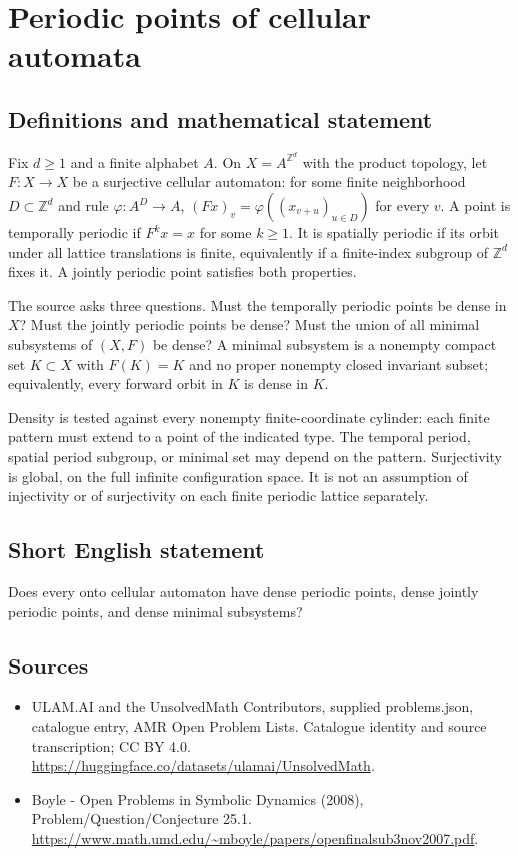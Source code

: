 \documentclass[11pt,a4paper]{article}
\begin{document}
\section*{Periodic points of cellular automata}\label{statement}

\subsection{Definitions and mathematical statement}
Fix $d\ge1$ and a finite alphabet $A$. On $X=A^{\mathbb Z^d}$ with
the product topology, let $F:X\to X$ be a surjective cellular
automaton: for some finite neighborhood $D\subset\mathbb Z^d$
and rule $\varphi:A^D\to A$,
$(Fx)_v=\varphi((x_{v+u})_{u\in D})$ for every $v$.
A point is temporally periodic if $F^k x=x$ for some $k\ge1$.
It is spatially periodic if its orbit under all lattice translations
is finite, equivalently if a finite-index subgroup of $\mathbb Z^d$
fixes it. A jointly periodic point satisfies both properties.

The source asks three questions. Must the temporally periodic points
be dense in $X$? Must the jointly periodic points be dense? Must
the union of all minimal subsystems of $(X,F)$ be dense?
A minimal subsystem is a nonempty compact set $K\subset X$ with
$F(K)=K$ and no proper nonempty closed invariant subset;
equivalently, every forward orbit in $K$ is dense in $K$.

Density is tested against every nonempty finite-coordinate cylinder:
each finite pattern must extend to a point of the indicated type.
The temporal period, spatial period subgroup, or minimal set may
depend on the pattern. Surjectivity is global, on the full infinite
configuration space. It is not an assumption of injectivity or of
surjectivity on each finite periodic lattice separately.
\subsection{Short English statement}
Does every onto cellular automaton have dense periodic points, dense jointly periodic points, and dense minimal subsystems?
\subsection{Sources}
\begin{itemize}
\item[S1] ULAM.AI and the UnsolvedMath Contributors, supplied problems.json, catalogue entry, AMR Open Problem Lists. Catalogue identity and source transcription; CC BY 4.0.
\url{https://huggingface.co/datasets/ulamai/UnsolvedMath}.
\item[S2] Boyle - Open Problems in Symbolic Dynamics (2008), Problem/Question/Conjecture 25.1. 
\url{https://www.math.umd.edu/~mboyle/papers/openfinalsub3nov2007.pdf}.
\end{itemize}
\end{document}
